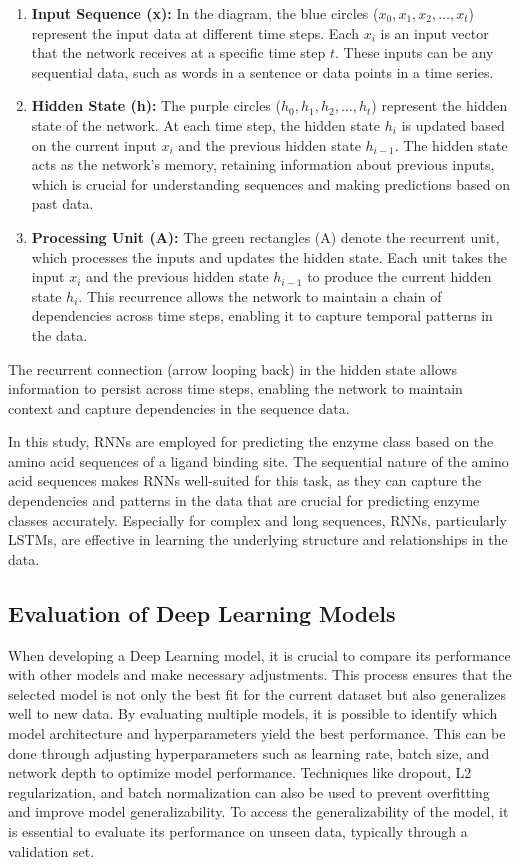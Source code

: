 \begin{enumerate}
    \item \textbf{Input Sequence (x):} In the diagram, the blue circles ($x_0, x_1, x_2, \dots, x_t$) represent the input data at different time steps. Each $x_i$ is an input vector that the network receives at a specific time step $t$. These inputs can be any sequential data, such as words in a sentence or data points in a time series.
    \item \textbf{Hidden State (h):} The purple circles ($h_0, h_1, h_2, \dots, h_t$) represent the hidden state of the network. At each time step, the hidden state $h_i$ is updated based on the current input $x_i$ and the previous hidden state $h_{i-1}$. The hidden state acts as the network's memory, retaining information about previous inputs, which is crucial for understanding sequences and making predictions based on past data.
    \item \textbf{Processing Unit (A):} The green rectangles (A) denote the recurrent unit, which processes the inputs and updates the hidden state. Each unit takes the input $x_i$ and the previous hidden state $h_{i-1}$ to produce the current hidden state $h_i$. This recurrence allows the network to maintain a chain of dependencies across time steps, enabling it to capture temporal patterns in the data.
\end{enumerate}

The recurrent connection (arrow looping back) in the hidden state allows information to persist across time steps, enabling the network to maintain context and capture dependencies in the sequence data.

In this study, RNNs are employed for predicting the enzyme class based on the amino acid sequences of a ligand binding site. The sequential nature of the amino acid sequences makes RNNs well-suited for this task, as they can capture the dependencies and patterns in the data that are crucial for predicting enzyme classes accurately. Especially for complex and long sequences, RNNs, particularly LSTMs, are effective in learning the underlying structure and relationships in the data.

\subsection{Evaluation of Deep Learning Models}
\label{sec:Evaluation of Deep Learning Models}

When developing a Deep Learning model, it is crucial to compare its performance with other models and make necessary adjustments. This process ensures that the selected model is not only the best fit for the current dataset but also generalizes well to new data. By evaluating multiple models, it is possible to identify which model architecture and hyperparameters yield the best performance. This can be done through adjusting hyperparameters such as learning rate, batch size, and network depth to optimize model performance. Techniques like dropout, L2 regularization, and batch normalization can also be used to prevent overfitting and improve model generalizability. To access the generalizability of the model, it is essential to evaluate its performance on unseen data, typically through a validation set.

